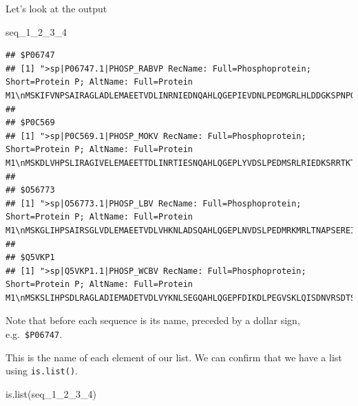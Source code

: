 \documentclass[
]{book}
\newenvironment{Shaded}{\begin{snugshade}}{\end{snugshade}}
\newcommand{\FunctionTok}[1]{\textcolor[rgb]{0.00,0.00,0.00}{#1}}
\newcommand{\NormalTok}[1]{#1}
\begin{document}
Let's look at the output

\begin{Shaded}
\begin{Highlighting}[]
\NormalTok{seq\_1\_2\_3\_4}
\end{Highlighting}
\end{Shaded}

\begin{verbatim}
## $P06747
## [1] ">sp|P06747.1|PHOSP_RABVP RecName: Full=Phosphoprotein; Short=Protein P; AltName: Full=Protein M1\nMSKIFVNPSAIRAGLADLEMAEETVDLINRNIEDNQAHLQGEPIEVDNLPEDMGRLHLDDGKSPNPGEMA\nKVGEGKYREDFQMDEGEDPSLLFQSYLDNVGVQIVRQIRSGERFLKIWSQTVEEIISYVAVNFPNPPGKS\nSEDKSTQTTGRELKKETTPTPSQRESQSSKARMAAQTASGPPALEWSATNEEDDLSVEAEIAHQIAESFS\nKKYKFPSRSSGILLYNFEQLKMNLDDIVKEAKNVPGVTRLARDGSKLPLRCVLGWVALANSKKFQLLVES\nNKLSKIMQDDLNRYTSC\n\n"
## 
## $P0C569
## [1] ">sp|P0C569.1|PHOSP_MOKV RecName: Full=Phosphoprotein; Short=Protein P; AltName: Full=Protein M1\nMSKDLVHPSLIRAGIVELEMAEETTDLINRTIESNQAHLQGEPLYVDSLPEDMSRLRIEDKSRRTKTEEE\nERDEGSSEEDNYLSEGQDPLIPFQNFLDEIGARAVKRLKTGEGFFRVWSALSDDIKGYVSTNIMTSGERD\nTKSIQIQTEPTASVSSGNESRHDSESMHDPNDKKDHTPDHDVVPDIESSTDKGEIRDIEGEVAHQVAESF\nSKKYKFPSRSSGIFLWNFEQLKMNLDDIVKAAMNVPGVERIAEKGGKLPLRCILGFVALDSSKRFRLLAD\nNDKVARLIQEDINSYMARLEEAE\n\n"
## 
## $O56773
## [1] ">sp|O56773.1|PHOSP_LBV RecName: Full=Phosphoprotein; Short=Protein P; AltName: Full=Protein M1\nMSKGLIHPSAIRSGLVDLEMAEETVDLVHKNLADSQAHLQGEPLNVDSLPEDMRKMRLTNAPSEREIIEE\nDEEEYSSEDEYYLSQGQDPMVPFQNFLDELGTQIVRRMKSGDGFFKIWSAASEDIKGYVLSTFMKPETQA\nTVSKPTQTDSLSVPRPSQGYTSVPRDKPSNSESQGGGVKPKKVQKSEWTRDTDEISDIEGEVAHQVAESF\nSKKYKFPSRSSGIFLWNFEQLKMNLDDIVKTSMNVPGVDKIAEKGGKLPLRCILGFVSLDSSKRFRLLAD\nTDKVARLMQDDIHNYMTRIEEIDHN\n\n"
## 
## $Q5VKP1
## [1] ">sp|Q5VKP1.1|PHOSP_WCBV RecName: Full=Phosphoprotein; Short=Protein P; AltName: Full=Protein M1\nMSKSLIHPSDLRAGLADIEMADETVDLVYKNLSEGQAHLQGEPFDIKDLPEGVSKLQISDNVRSDTSPNE\nYSDEDDEEGEDEYEEVYDPVSAFQDFLDETGSYLISKLKKGEKIKKTWSEVSRVIYSYVMSNFPPRPPKP\nTTKDIAVQADLKKPNEIQKISEHKSKSEPSPREPVVEMHKHATLENPEDDEGALESEIAHQVAESYSKKY\nKFPSKSSGIFLWNFEQLKMNLDDIVQVARGVPGISQIVERGGKLPLRCMLGYVGLETSKRFRSLVNQDKL\nCKLMQEDLNAYSVSSNN\n\n"
\end{verbatim}

Note that before each sequence is its name, preceded by a dollar sign, e.g.~\texttt{\$P06747}.

This is the name of each element of our list. We can confirm that we have a list using \texttt{is.list()}.

\begin{Shaded}
\begin{Highlighting}[]
\FunctionTok{is.list}\NormalTok{(seq\_1\_2\_3\_4)}
\end{Highlighting}
\end{Shaded}
\end{document}
